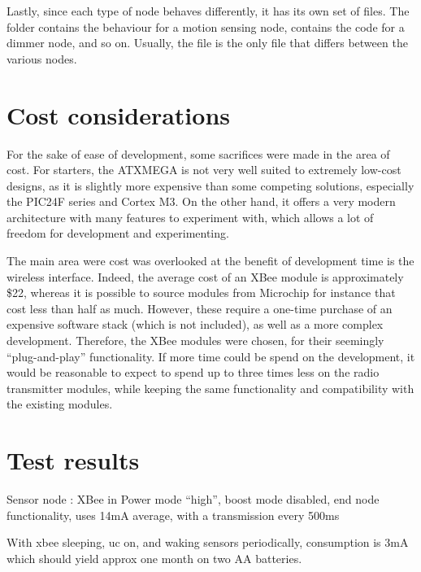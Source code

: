 Lastly, since each type of node behaves differently, it has its own set of
files. The  folder contains the behaviour for a motion
sensing node,  contains the code for a dimmer node, and so
on. Usually, the  file is the only file that differs between the
various nodes.

\section{Cost considerations}

For the sake of ease of development, some sacrifices were made in the area of
cost. For starters, the ATXMEGA is not very well suited to extremely low-cost
designs, as it is slightly more expensive than some competing solutions,
especially the PIC24F series and Cortex M3. On the other hand, it offers a very
modern architecture with many features to experiment with, which allows a lot of
freedom for development and experimenting.


The main area were cost was overlooked at the benefit of development time
is the wireless interface. Indeed, the average cost of an XBee module is
approximately \$22, whereas it is possible to source modules from Microchip for
instance that cost less than half as much. However, these require a one-time
purchase of an expensive software stack (which is not included), as well as a
more complex development. Therefore, the XBee modules were chosen, for their
seemingly ``plug-and-play'' functionality. If more time could be spend on the
development, it would be reasonable to expect to spend up to three times less on
the radio transmitter modules, while keeping the same functionality and
compatibility with the existing modules.


\section{Test results}

Sensor node : XBee in Power mode ``high'', boost mode disabled, end node
functionality, uses 14mA average, with a transmission every 500ms

With xbee sleeping, uc on, and waking sensors periodically, consumption is 3mA
which should yield approx one month on two AA batteries.

